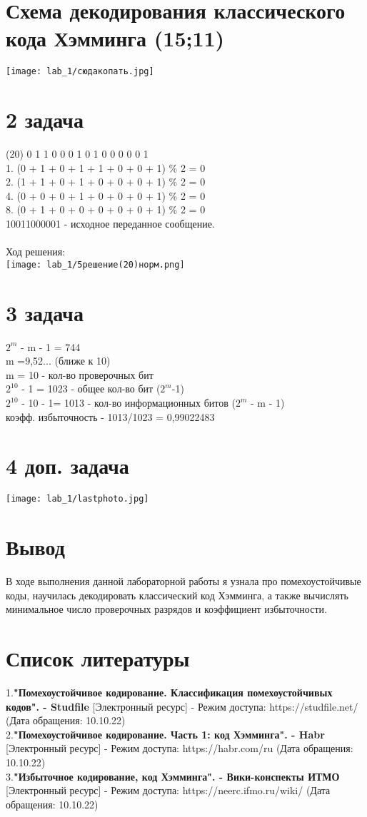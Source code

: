 \documentclass[a4paper]{article}
\begin{document}
\section{Схема декодирования классического кода Хэмминга (15;11)}
\texttt{[image: lab\_1/сюдакопать.jpg]}
\newpage
\section{2 задача}
(20) 0 1 1 0 0 0 1 0 1 0 0 0 0 0 1 \\
   1. (0 + 1 + 0 + 1 + 1 + 0 + 0 + 1) \% 2 = 0\\
   2. (1 + 1 + 0 + 1 + 0 + 0 + 0 + 1) \% 2 = 0\\
   4. (0 + 0 + 0 + 1 + 0 + 0 + 0 + 1) \% 2 = 0 \\
   8. (0 + 1 + 0 + 0 + 0 + 0 + 0 + 1) \% 2 = 0\\ 
   10011000001 - исходное переданное сообщение.
\\
\\
Ход решения:
\\
\texttt{[image: lab\_1/5решение(20)норм.png]}
\section{3 задача}
$2^m$ - m - 1 = 744
\\
m =9,52... (ближе к 10)
\\
m = 10 - кол-во проверочных бит
\\
$2^{10}$ - 1 = 1023 - общее кол-во бит ($2^m$-1)
\\
$2^{10}$ - 10 - 1= 1013 - кол-во информационных битов ($2^m$ - m - 1)
\\
коэфф. избыточность - 1013/1023 = 0,99022483
\section{4 доп. задача}
\texttt{[image: lab\_1/lastphoto.jpg]}
\newpage
\section{Вывод}
В ходе выполнения данной лабораторной работы я узнала про помехоустойчивые коды, научилась декодировать классический код Хэмминга, а также вычислять минимальное число проверочных разрядов и коэффициент избыточности.
\newpage
\section{Список литературы}
1.\textbf{"Помехоустойчивое кодирование. Классификация помехоустойчивых кодов". - Studfile} [Электронный ресурс] - Режим доступа: https://studfile.net/ (Дата обращения: 10.10.22)\\
2.\textbf{"Помехоустойчивое кодирование. Часть 1: код Хэмминга". - Habr} [Электронный ресурс] - Режим доступа: https://habr.com/ru (Дата обращения: 10.10.22)\\
3.\textbf{"Избыточное кодирование, код Хэмминга". - Вики-конспекты ИТМО} [Электронный ресурс] - Режим доступа: https://neerc.ifmo.ru/wiki/ (Дата обращения: 10.10.22)\\
\end{document}
